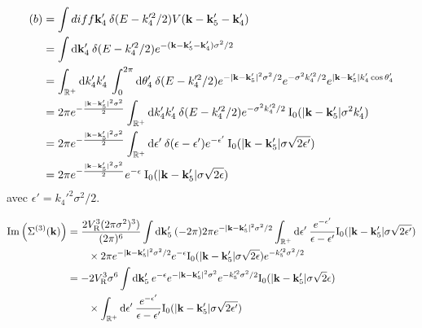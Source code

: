 \begin{align}
(b)&=\int{diff\mathbf{k}_{\mathrm{4}}' \: \delta(E-k_{\mathrm{4}}'^2/2) V(\mathbf{k}-\mathbf{k}_{\mathrm{5}}' -\mathbf{k}_{\mathrm{4}}')} \\
&= \int{\mathop{}\mathopen{}\mathrm{d}\mathbf{k}_{\mathrm{4}}' \: \delta(E-k_{\mathrm{4}}'^2/2) e^{-(\mathbf{k}-\mathbf{k}_{\mathrm{5}}'-\mathbf{k}_{\mathrm{4}}')\sigma^2/2}}\\
&=\int_{\mathbb{R}^+}{\mathop{}\mathopen{}\mathrm{d} k_{\mathrm{4}}' k_{\mathrm{4}}' \: \int_0^{2\pi}{\mathop{}\mathopen{}\mathrm{d}\theta_{\mathrm{4}}' \: \delta(E-k_{\mathrm{4}}'^2/2) e^{-|\mathbf{k}-\mathbf{k}_{\mathrm{5}}'|^2\sigma^2/2} e^{-\sigma^2 k_{\mathrm{4}}'^2/2} e^{|\mathbf{k}-\mathbf{k}_{\mathrm{5}}'| k_{\mathrm{4}}' \cos{\theta_{\mathrm{4}}'} } }} \\
&=2\pi e^{-\frac{|\mathbf{k}-\mathbf{k}_{\mathrm{5}}'|^2\sigma^2}{2}} \int_{\mathbb{R}^+}{\mathop{}\mathopen{}\mathrm{d} k_{\mathrm{4}}' k_{\mathrm{4}}' \:\delta(E- k_{\mathrm{4}}'^2/2) e^{-\sigma^2 k_{\mathrm{4}}'^2/2} \: \mathrm{I_0}(|\mathbf{k}-\mathbf{k}_{\mathrm{5}}'| \sigma^2 k_{\mathrm{4}}')}\\
&=2\pi e^{-\frac{|\mathbf{k}-\mathbf{k}_{\mathrm{5}}'|^2\sigma^2}{2}} \int_{\mathbb{R}^+}{\mathop{}\mathopen{}\mathrm{d}\epsilon' \:\delta(\epsilon-\epsilon') e^{-\epsilon'} \: \mathrm{I_0}(|\mathbf{k}-\mathbf{k}_{\mathrm{5}}'| \sigma \sqrt{2\epsilon'})}\\
&=2\pi e^{-\frac{|\mathbf{k}-\mathbf{k}_{\mathrm{5}}'|^2\sigma^2}{2}} e^{-\epsilon} \: \mathrm{I_0}(|\mathbf{k}-\mathbf{k}_{\mathrm{5}}'| \sigma \sqrt{2\epsilon})
\end{align}
avec $\epsilon'=k_{\mathrm{4}}'^2\sigma^2/2$.


\begin{align}
\mathrm{Im}\left( \Sigma^{(3)}(\mathbf{k})\right)&= \frac{2 V_{\mathrm{R}}^3 (2\pi\sigma^2)^3)}{(2\pi)^6} \int{\mathop{}\mathopen{}\mathrm{d}\mathbf{k}_{\mathrm{5}}' \: (-2\pi) 2\pi e^{-|\mathbf{k}-\mathbf{k}_{\mathrm{5}}'|^2\sigma^2/2} \int_{\mathbb{R}^+}{\mathop{}\mathopen{}\mathrm{d}\epsilon' \: \frac{e^{-\epsilon'}}{\epsilon-\epsilon'} \mathrm{I_0}(|\mathbf{k}-\mathbf{k}_{\mathrm{5}}'|\sigma\sqrt{2\epsilon'})}}\\
&\nonumber \qquad \times 2\pi e^{-|\mathbf{k}-\mathbf{k}_{\mathrm{5}}'|^2\sigma^2/2} e^{-\epsilon} \mathrm{I_0}(|\mathbf{k}-\mathbf{k}_{\mathrm{5}}'|\sigma \sqrt{2\epsilon}) e^{-k_{\mathrm{5}}'^2\sigma^2/2} \\
 &= -2V_{\mathrm{R}}^3\sigma^6 \int{\mathop{}\mathopen{}\mathrm{d}\mathbf{k}_{\mathrm{5}}' \: e^{-\epsilon} e^{-|\mathbf{k}-\mathbf{k}_{\mathrm{5}}'|^2 \sigma^2} e^{-k_{\mathrm{5}}'^2 \sigma^2/2} \mathrm{I_0}(|\mathbf{k}-\mathbf{k}_{\mathrm{5}}'|\sigma \sqrt{2}\epsilon)} \\
 &\nonumber \qquad \times \int_{\mathbb{R}^+}{\mathop{}\mathopen{}\mathrm{d} \epsilon' \: \frac{e^{-\epsilon'}}{\epsilon-\epsilon'} \mathrm{I_0}(|\mathbf{k}-\mathbf{k}_{\mathrm{5}}'|\sigma \sqrt{2\epsilon'})}
\end{align}



